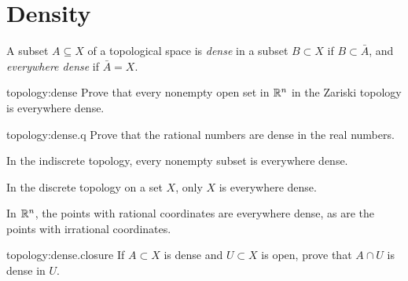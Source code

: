 \section{Density}
A subset \(A \subseteq X\) of a topological space is \emph{dense} in a subset \(B \subset X\) if \(B \subset \bar{A}\), and \emph{everywhere dense} if \(\bar{A}=X\).
\begin{problem}{topology:dense}
Prove that every nonempty open set in \(\mathbb{R}^{n}\) in the Zariski topology is everywhere dense.
\end{problem}
\begin{problem}{topology:dense.q}
Prove that the rational numbers are dense in the real numbers.
\end{problem}
\begin{example}
In the indiscrete topology, every nonempty subset is everywhere dense.
\end{example}
\begin{example}
In the discrete topology on a set \(X\), only \(X\) is everywhere dense.
\end{example}
\begin{example}
In \(\mathbb{R}^{n}\), the points with rational coordinates are everywhere dense, as are the points with irrational coordinates.
\end{example}
\begin{problem}{topology:dense.closure}
If \(A \subset X\) is dense and \(U \subset X\) is open, prove that \(A \cap U\) is dense in \(U\).
\end{problem}

